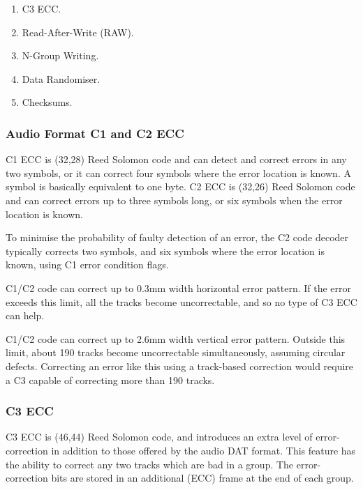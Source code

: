 \begin {enumerate}

\item C3 ECC.

\item Read-After-Write (RAW).

\item N-Group Writing.

\item Data Randomiser.

\item Checksums.

\end {enumerate}

\subsubsection {Audio Format C1 and C2 ECC}

C1 ECC is (32,28) Reed Solomon code and can detect and correct errors in any
two symbols, or it can correct four symbols where the error location is
known. A symbol is basically equivalent to one byte. C2 ECC is (32,26) Reed
Solomon code and can correct errors up to three symbols long, or six symbols
when the error location is known.

To minimise the probability of faulty detection of an error, the C2 code
decoder typically corrects two symbols, and six symbols where the error
location is known, using C1 error condition flags.

C1/C2 code can correct up to 0.3mm width horizontal error pattern. If the
error exceeds this limit, all the tracks become uncorrectable, and so no
type of C3 ECC can help.

C1/C2 code can correct up to 2.6mm width vertical error pattern. Outside
this limit, about 190 tracks become uncorrectable simultaneously, assuming
circular defects. Correcting an error like this using a track-based
correction would require a C3 capable of correcting more than 190 tracks.

\subsubsection {C3 ECC}

C3 ECC is (46,44) Reed Solomon code, and introduces an extra level of
error-correction in addition to those offered by the audio DAT format. This
feature has the ability to correct any two tracks which are bad in a group.
The error-correction bits are stored in an additional (ECC) frame at the end
of each group.


